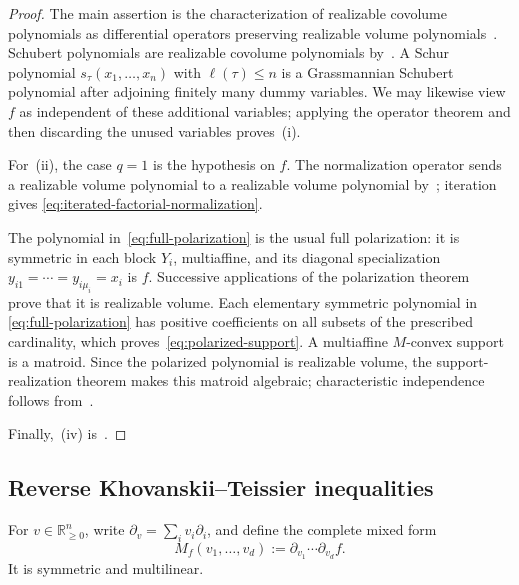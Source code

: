 \documentclass[11pt,a4paper,oneside]{amsart}
\numberwithin{equation}{section}
\theoremstyle{definition}
\theoremstyle{remark}
\newcommand{\R}{\mathbb R}
\begin{document}
\begin{proof}
The main assertion is the characterization of realizable covolume
polynomials as differential operators preserving realizable volume
polynomials~\cite[Theorem~1.3]{GHMSW25}.  Schubert polynomials are realizable
covolume polynomials by~\cite[Corollary~2.4]{GHMSW25}.  A Schur polynomial
$s_\tau(x_1,\ldots,x_n)$ with $\ell(\tau)\leq n$ is a Grassmannian Schubert
polynomial after adjoining finitely many dummy variables.  We may likewise view
$f$ as independent of these additional variables; applying the operator theorem
and then discarding the unused variables proves~(i).

For~(ii), the case $q=1$ is the hypothesis on $f$.  The normalization operator
sends a realizable volume polynomial to a realizable volume polynomial
by~\cite[Proposition~4.2]{GHMSW25}; iteration gives
\eqref{eq:iterated-factorial-normalization}.

The polynomial in~\eqref{eq:full-polarization} is the usual full polarization:
it is symmetric in each block $Y_i$, multiaffine, and its diagonal
specialization $y_{i1}=\cdots=y_{i\mu_i}=x_i$ is $f$.  Successive applications
of the polarization theorem~\cite[Proposition~4.1]{GHMSW25} prove that it is
realizable volume.  Each elementary symmetric polynomial in
\eqref{eq:full-polarization} has positive coefficients on all subsets of the
prescribed cardinality, which proves~\eqref{eq:polarized-support}.  A
multiaffine $M$-convex support is a matroid.  Since the polarized polynomial is
realizable volume, the support-realization theorem
\cite[Proposition~5.4]{GHMSW25} makes this matroid algebraic; characteristic
independence follows from~\cite[Proposition~2.10]{GHMSW25}.

Finally,~(iv) is~\cite[Propositions~4.3 and~4.4]{GHMSW25}.
\end{proof}

\subsection{Reverse Khovanskii--Teissier inequalities}

For $v\in\R_{\geq0}^n$, write $\partial_v=\sum_i v_i\partial_i$, and define the complete mixed form
\begin{equation}\label{eq:complete-mixed-form}
 M_f(v_1,\ldots,v_d)
 :=\partial_{v_1}\cdots\partial_{v_d}f.
\end{equation}
It is symmetric and multilinear.
\end{document}

